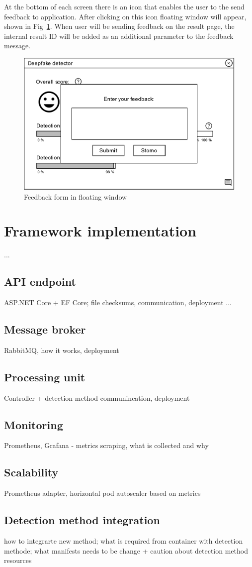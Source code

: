 At the bottom of each screen there is an icon that enables the user to the send feedback to application. After clicking on this icon floating window will appear, shown in Fig~\ref{fig:client_wireframe_feedback}. When user will be sending feedback on the result page, the internal result ID will be added as an additional parameter to the feedback message. 

\begin{figure}[H]
    \centering
    \includegraphics[width=.475\linewidth]{other-fig/client_wireframe_feedback.png}
    \caption{Feedback form in floating window}
\label{fig:client_wireframe_feedback}
\end{figure}

\chapter{Framework implementation}
...
\section{API endpoint}
ASP.NET Core + EF Core; file checksums, communication, deployment ...
\section{Message broker}
RabbitMQ, how it works, deployment
\section{Processing unit}
Controller + detection method communincation, deployment
\section{Monitoring}
Prometheus, Grafana - metrics scraping, what is collected and why
\section{Scalability}
Prometheus adapter, horizontal pod autoscaler based on metrics
\section{Detection method integration}
how to integrarte new method; what is required from container with detection methode; what manifests needs to be change + caution about detection method resources

